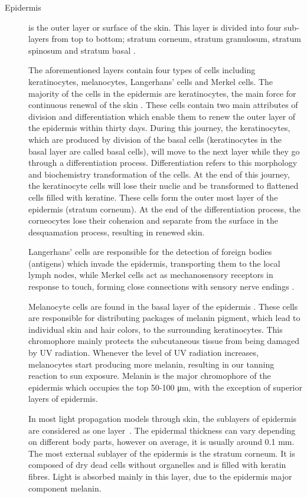 \begin{description}
	\item[Epidermis] is the outer layer or surface of the skin. This layer is divided into four sub-layers from top to bottom; stratum corneum, stratum granulosum, stratum spinosum and stratum basal \cite{mcgrath2010anatomy}.

The aforementioned layers contain four types of cells including keratinocytes, melanocytes, Langerhans' cells and Merkel cells. 
The majority of the cells in the epidermis are keratinocytes, the main force for continuous renewal of the skin \cite{mcgrath2010anatomy}.
These cells contain two main attributes of division and differentiation which enable them to renew the outer layer of the epidermis within thirty days.
During this journey, the keratinocytes, which are produced by division of the basal cells (keratinocytes in the basal layer are called basal cells), will move to the next layer while they go through a differentiation process.
Differentiation refers to this morphology and biochemistry transformation of the cells.
At the end of this journey, the keratinocyte cells will lose their nuclie and be transformed to flattened cells filled with keratine.
These cells form the outer most layer of the epidermis (stratum corneum).
At the end of the differentiation process, the corneocytes lose their cohension and separate from the surface in the desquamation process, resulting in renewed skin.

Langerhans' cells are responsible for the detection of foreign bodies (antigens) which invade the epidermis, transporting them to the local lymph nodes, while Merkel cells act as mechanosensory receptors in response to touch, forming close connections with sensory nerve endings \cite{mcgrath2010anatomy}.

Melanocyte cells are found in the basal layer of the epidermis \cite{mcgrath2010anatomy}.
These cells are responsible for distributing packages of melanin pigment, which lead to individual skin and hair colors, to the surrounding keratinocytes.
This chromophore mainly protects the subcutaneous tissue from being damaged by UV radiation.
Whenever the level of UV radiation increases, melanocytes start producing more melanin, resulting in our tanning reaction to sun exposure.
Melanin is the major chromophore of the epidermis which occupies the top 50-100 \si{\micro\meter}, with the exception of superior layers of epidermis.  

In most light propagation models through skin, the sublayers of epidermis are considered as one layer~\cite{lu2000modeling,jolivot2011developpement}.
The epidermal thickness can vary depending on different body parts, however on average, it is usually around 0.1 mm.
The most external sublayer of the epidermis is the stratum corneum.
It is composed of dry dead cells without organelles and is filled with keratin fibres.
Light is absorbed mainly in this layer, due to the epidermis major component melanin.	


\end{description}
